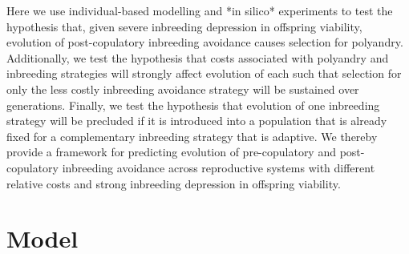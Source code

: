 \documentclass[10pt,letterpaper]{article}
\begin{document}
Here we use individual-based modelling and *in silico* experiments to test the hypothesis that, given severe inbreeding depression in offspring viability, evolution of post-copulatory inbreeding avoidance causes selection for polyandry. Additionally, we test the hypothesis that costs associated with polyandry and inbreeding strategies will strongly affect evolution of each such that selection for only the less costly inbreeding avoidance strategy will be sustained over generations. Finally, we test the hypothesis that evolution of one inbreeding strategy will be precluded if it is introduced into a population that is already fixed for a complementary inbreeding strategy that is adaptive. We thereby provide a framework for predicting evolution of pre-copulatory and post-copulatory inbreeding avoidance across reproductive systems with different relative costs and strong inbreeding depression in offspring viability.

\section*{Model}
\end{document}

